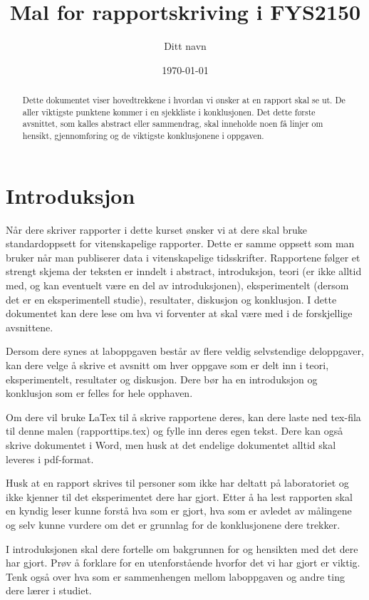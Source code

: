 \documentclass[norsk,a4paper,12pt]{article}
\title{Mal for rapportskriving i FYS2150}
\author{Ditt navn}
\date{\today}
\begin{document}
\maketitle

\begin{abstract}
Dette dokumentet viser hovedtrekkene i hvordan vi ønsker at en rapport skal se ut. De aller viktigste punktene kommer i en sjekkliste i konklusjonen.
Det dette første avsnittet, som kalles abstract eller sammendrag, skal inneholde noen få linjer om hensikt, gjennomføring og de viktigste konklusjonene i oppgaven.
\end{abstract}

\section{Introduksjon}
Når dere skriver rapporter i dette kurset ønsker vi at dere skal bruke standardoppsett for vitenskapelige rapporter. Dette er samme oppsett som man bruker når man publiserer data i vitenskapelige tidsskrifter. Rapportene følger et strengt skjema der teksten er inndelt i abstract, introduksjon, teori (er ikke alltid med, og kan eventuelt være en del av introduksjonen), eksperimentelt (dersom det er en eksperimentell studie), resultater, diskusjon og konklusjon. I dette dokumentet kan dere lese om hva vi forventer at skal være med i de forskjellige avsnittene.

Dersom dere synes at laboppgaven består av flere veldig selvstendige deloppgaver, kan dere velge å skrive et avsnitt om hver oppgave som er delt inn i teori, eksperimentelt, resultater og diskusjon. Dere bør ha en introduksjon og konklusjon som er felles for hele opphaven.

Om dere vil bruke LaTex til å skrive rapportene deres, kan dere laste ned tex-fila til denne malen (rapporttips.tex) og fylle inn deres egen tekst. Dere kan også skrive dokumentet i Word, men husk at det endelige dokumentet alltid skal leveres i pdf-format.

Husk at en rapport skrives til personer som ikke har deltatt på laboratoriet og ikke kjenner til det eksperimentet dere har gjort. Etter å ha lest rapporten skal en kyndig leser kunne forstå hva som er gjort, hva som er avledet av målingene og selv kunne vurdere om det er grunnlag for de konklusjonene dere trekker.

I introduksjonen skal dere fortelle om bakgrunnen for og hensikten med det dere har gjort. Prøv å forklare for en utenforstående hvorfor det vi har gjort er viktig. Tenk også over hva som er sammenhengen mellom laboppgaven og andre ting dere lærer i studiet.
\end{document}
